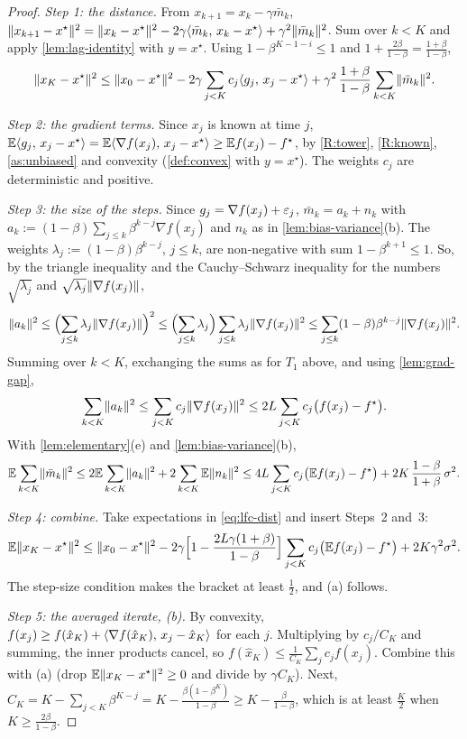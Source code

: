 \begin{proof}
\emph{Step 1: the distance.} From $x_{k+1}=x_k-\gamma\bar m_k$,
$\lVert x_{k+1}-x^\star\rVert^2=\lVert x_k-x^\star\rVert^2-2\gamma\langle \bar m_k,\, x_k-x^\star\rangle+\gamma^2\lVert \bar m_k\rVert^2$.
Sum over $k<K$ and apply \cref{lem:lag-identity} with $y=x^\star$. Using
$1-\beta^{K-1-i}\le1$ and $1+\frac{2\beta}{1-\beta}=\frac{1+\beta}{1-\beta}$,
\begin{equation}\label{eq:lfc-dist}
  \lVert x_K-x^\star\rVert^2\le\lVert x_0-x^\star\rVert^2-2\gamma\sum_{j<K}c_j\langle g_j,\, x_j-x^\star\rangle
  +\gamma^2\,\frac{1+\beta}{1-\beta}\sum_{k<K}\lVert \bar m_k\rVert^2 .
\end{equation}

\emph{Step 2: the gradient terms.} Since $x_j$ is known at time $j$,
$\mathbb{E}\langle g_j,\, x_j-x^\star\rangle=\mathbb{E}\langle \nabla f(x_j),\, x_j-x^\star\rangle\ge\mathbb{E} f(x_j)-f^\star$, by \ref{R:tower},
\ref{R:known}, \cref{as:unbiased} and convexity (\cref{def:convex} with $y=x^\star$).
The weights $c_j$ are deterministic and positive.

\emph{Step 3: the size of the steps.} Since $g_j=\nabla f(x_j)+\varepsilon_j$,
$\bar m_k=a_k+n_k$ with $a_k:=(1-\beta)\sum_{j\le k}\beta^{k-j}\nabla f(x_j)$ and $n_k$ as in
\cref{lem:bias-variance}(b). The weights $\lambda_j:=(1-\beta)\beta^{k-j}$, $j\le k$, are
non-negative with sum $1-\beta^{k+1}\le1$. So, by the triangle inequality and the
Cauchy--Schwarz inequality for the numbers $\sqrt{\lambda_j}$ and $\sqrt{\lambda_j}\lVert \nabla f(x_j)\rVert$,
\[
  \lVert a_k\rVert^2\le\Bigl(\sum_{j\le k}\lambda_j\lVert \nabla f(x_j)\rVert\Bigr)^2
  \le\Bigl(\sum_{j\le k}\lambda_j\Bigr)\sum_{j\le k}\lambda_j\lVert \nabla f(x_j)\rVert^2
  \le\sum_{j\le k}(1-\beta)\beta^{k-j}\lVert \nabla f(x_j)\rVert^2 .
\]
Summing over $k<K$, exchanging the sums as for $T_1$ above, and using \cref{lem:grad-gap},
\[
  \sum_{k<K}\lVert a_k\rVert^2\le\sum_{j<K}c_j\lVert \nabla f(x_j)\rVert^2\le2L\sum_{j<K}c_j\bigl(f(x_j)-f^\star\bigr).
\]
With \cref{lem:elementary}(e) and \cref{lem:bias-variance}(b),
\[
  \mathbb{E}\sum_{k<K}\lVert \bar m_k\rVert^2\le2\mathbb{E}\sum_{k<K}\lVert a_k\rVert^2+2\sum_{k<K}\mathbb{E}\lVert n_k\rVert^2
  \le4L\sum_{j<K}c_j\bigl(\mathbb{E} f(x_j)-f^\star\bigr)+2K\,\frac{1-\beta}{1+\beta}\,\sigma^2 .
\]

\emph{Step 4: combine.} Take expectations in \eqref{eq:lfc-dist} and insert Steps~2 and~3:
\[
  \mathbb{E}\lVert x_K-x^\star\rVert^2\le\lVert x_0-x^\star\rVert^2
  -2\gamma\Bigl[1-\frac{2L\gamma(1+\beta)}{1-\beta}\Bigr]\sum_{j<K}c_j\bigl(\mathbb{E} f(x_j)-f^\star\bigr)+2K\gamma^2\sigma^2 .
\]
The step-size condition makes the bracket at least $\frac12$, and (a) follows.

\emph{Step 5: the averaged iterate, (b).} By convexity,
$f(x_j)\ge f(\hat x_K)+\langle \nabla f(\hat x_K),\, x_j-\hat x_K\rangle$ for each $j$. Multiplying by
$c_j/C_K$ and summing, the inner products cancel, so
$f(\hat x_K)\le\frac1{C_K}\sum_jc_jf(x_j)$. Combine this with (a) (drop
$\mathbb{E}\lVert x_K-x^\star\rVert^2\ge0$ and divide by $\gamma C_K$). Next,
$C_K=K-\sum_{j<K}\beta^{K-j}=K-\frac{\beta(1-\beta^K)}{1-\beta}\ge K-\frac{\beta}{1-\beta}$, which
is at least $\frac K2$ when $K\ge\frac{2\beta}{1-\beta}$.


\end{proof}
